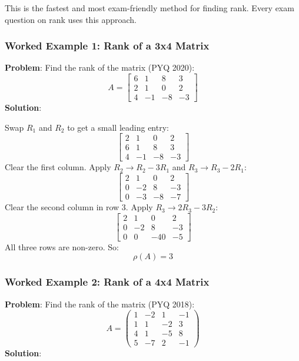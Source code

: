 \documentclass[
]{article}
\begin{document}
This is the fastest and most exam-friendly method for finding rank.
Every exam question on rank uses this approach.

\subsubsection{Worked Example 1: Rank of a 3x4
Matrix}\label{worked-example-1-rank-of-a-3x4-matrix}

\textbf{Problem}: Find the rank of the matrix (PYQ 2020):
\[
A =
\begin{bmatrix}
6 & 1 & 8 & 3 \\
2 & 1 & 0 & 2 \\
4 & -1 & -8 & -3
\end{bmatrix}
\]
\textbf{Solution}:

Swap \(R_1\) and \(R_2\) to get a small leading entry:
\[
\begin{bmatrix}
2 & 1 & 0 & 2 \\
6 & 1 & 8 & 3 \\
4 & -1 & -8 & -3
\end{bmatrix}
\]
Clear the first column. Apply \(R_2 \to R_2 - 3R_1\) and
\(R_3 \to R_3 - 2R_1\):
\[
\begin{bmatrix}
2 & 1 & 0 & 2 \\
0 & -2 & 8 & -3 \\
0 & -3 & -8 & -7
\end{bmatrix}
\]
Clear the second column in row 3. Apply \(R_3 \to 2R_3 - 3R_2\):
\[
\begin{bmatrix}
2 & 1 & 0 & 2 \\
0 & -2 & 8 & -3 \\
0 & 0 & -40 & -5
\end{bmatrix}
\]
All three rows are non-zero. So:
\[
\rho(A) = 3
\]

\subsubsection{Worked Example 2: Rank of a 4x4
Matrix}\label{worked-example-2-rank-of-a-4x4-matrix}

\textbf{Problem}: Find the rank of the matrix (PYQ 2018):
\[
A =
\begin{pmatrix}
1 & -2 & 1 & -1 \\
1 & 1 & -2 & 3 \\
4 & 1 & -5 & 8 \\
5 & -7 & 2 & -1
\end{pmatrix}
\]
\textbf{Solution}:
\end{document}

